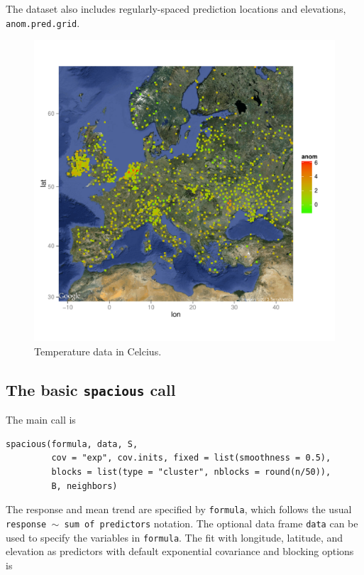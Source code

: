\documentclass[11pt]{article}
\begin{document}
The dataset also includes regularly-spaced prediction locations and elevations, {\tt anom.pred.grid}.

\begin{figure}
	\caption{Temperature data in Celcius.}\label{f:data}
	\centering
	\includegraphics[width=5.5in]{figures/data.pdf}
\end{figure}

\subsection{The basic {\tt spacious} call}

The main call is

\begin{verbatim}
spacious(formula, data, S,
         cov = "exp", cov.inits, fixed = list(smoothness = 0.5),
         blocks = list(type = "cluster", nblocks = round(n/50)),
         B, neighbors)
\end{verbatim}

The response and mean trend are specified by {\tt formula}, which follows the usual {\tt response $\sim$ sum of predictors} notation.
The optional data frame {\tt data} can be used to specify the variables in {\tt formula}.
The fit with longitude, latitude, and elevation as predictors with default exponential covariance and blocking options is
\end{document}

